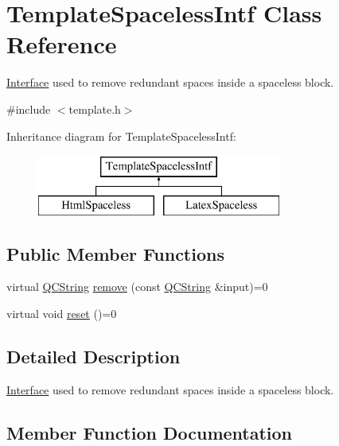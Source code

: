 \hypertarget{class_template_spaceless_intf}{}\section{Template\+Spaceless\+Intf Class Reference}
\label{class_template_spaceless_intf}


\mbox{\hyperlink{class_interface}{Interface}} used to remove redundant spaces inside a spaceless block.  




{\ttfamily \#include $<$template.\+h$>$}

Inheritance diagram for Template\+Spaceless\+Intf\+:\begin{figure}[H]
\begin{center}
\leavevmode
\includegraphics[height=2.000000cm]{class_template_spaceless_intf}
\end{center}
\end{figure}
\subsection*{Public Member Functions}
\begin{DoxyCompactItemize}
\item 
virtual \mbox{\hyperlink{class_q_c_string}{Q\+C\+String}} \mbox{\hyperlink{class_template_spaceless_intf_aa68919027a4736005174cbdf9159a8a9}{remove}} (const \mbox{\hyperlink{class_q_c_string}{Q\+C\+String}} \&input)=0
\item 
virtual void \mbox{\hyperlink{class_template_spaceless_intf_ae6f581a16baa634124ab2e798cc4064c}{reset}} ()=0
\end{DoxyCompactItemize}


\subsection{Detailed Description}
\mbox{\hyperlink{class_interface}{Interface}} used to remove redundant spaces inside a spaceless block. 

\subsection{Member Function Documentation}
\mbox{\label{class_template_spaceless_intf_aa68919027a4736005174cbdf9159a8a9}} 
